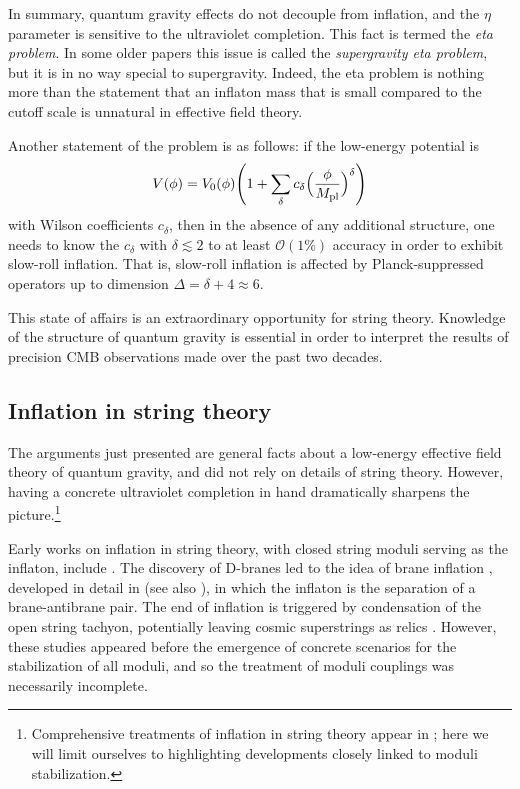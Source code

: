 \documentclass[12pt,a4wide]{article}
\begin{document}
In summary, quantum gravity effects do not decouple from inflation, and the $\eta$ parameter is sensitive to the ultraviolet completion. This fact is termed the \emph{eta problem}.  In some older papers this issue is called the \emph{supergravity eta problem}, but it is in no way special to supergravity.  Indeed, the eta problem is nothing more than the statement that an inflaton mass that is small compared to the cutoff scale is unnatural in effective field theory. 

Another statement of the problem is as follows: if the low-energy potential is
\begin{equation} \label{eq:etacorr}
    V(\phi) = V_0(\phi)\Biggl(1 + \sum_{\delta} c_{\delta}\Bigl(\frac{\phi}{M_{\text{pl}}}\Bigr)^{\delta}\Biggr)
\end{equation} with Wilson coefficients $c_{\delta}$, 
then in the absence of any additional structure, one needs to know the $c_{\delta}$ with $\delta \lesssim 2$ to at least $\mathcal{O}(1\%)$ accuracy in order to exhibit slow-roll inflation. 
That is, slow-roll inflation is affected by Planck-suppressed operators up to dimension $\Delta = \delta +4 \approx 6$. 




This state of affairs is an extraordinary opportunity for string theory.  Knowledge of the structure of quantum gravity is essential
in order to interpret the results of precision CMB observations made over the past two decades.  

\subsection{Inflation in string theory}\label{ss:inflationst}

The arguments just presented are general facts about a low-energy effective field theory of quantum gravity, and did not rely on details of string theory.  However, having a concrete ultraviolet completion in hand dramatically sharpens the picture.\footnote{Comprehensive treatments of inflation in string theory appear in \cite{Baumann:2014nda, Cicoli:2023opf}; here we will limit ourselves to highlighting developments closely linked to moduli stabilization.}

Early works on inflation in string theory, with closed string moduli serving as the inflaton, include \cite{Binetruy:1986ss,Banks:1995dp}.
The discovery of D-branes led to the idea of brane inflation \cite{Dvali:1998pa}, developed in detail in \cite{Burgess:2001fx} (see also \cite{Dvali:2001fw,Alexander:2001ks}), in which the inflaton is the separation of a brane-antibrane pair.
The end of inflation is triggered by condensation of the open string tachyon, potentially leaving cosmic superstrings as relics \cite{Sarangi:2002yt}.
However, these studies appeared before the emergence of concrete scenarios for the stabilization of all moduli, and so the treatment of moduli couplings was necessarily incomplete.
\end{document}

